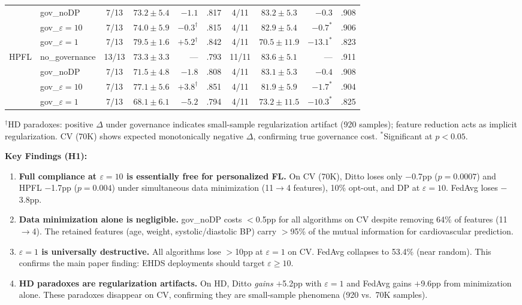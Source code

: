 \documentclass[conference]{IEEEtran}
\begin{document}
\begin{table}[htbp]
{\begin{tabular}{ll cc rr cc rr}
& gov\_noDP & 7/13 & $73.2 \pm 5.4$ & $-1.1$ & .817 & 4/11 & $83.2 \pm 5.3$ & $-0.3$ & .908 \\
& gov\_$\varepsilon{=}10$ & 7/13 & $74.0 \pm 5.9$ & $-0.3^{\dagger}$ & .815 & 4/11 & $\mathbf{82.9 \pm 5.4}$ & $\mathbf{-0.7^*}$ & .906 \\
& gov\_$\varepsilon{=}1$ & 7/13 & $79.5 \pm 1.6$ & $+5.2^{\dagger}$ & .842 & 4/11 & $70.5 \pm 11.9$ & $-13.1^*$ & .823 \\
\midrule
\multirow{4}{*}{HPFL}
& no\_governance & 13/13 & $73.3 \pm 3.3$ & --- & .793 & 11/11 & $83.6 \pm 5.1$ & --- & .911 \\
& gov\_noDP & 7/13 & $71.5 \pm 4.8$ & $-1.8$ & .808 & 4/11 & $83.1 \pm 5.3$ & $-0.4$ & .908 \\
& gov\_$\varepsilon{=}10$ & 7/13 & $77.1 \pm 5.6$ & $+3.8^{\dagger}$ & .851 & 4/11 & $81.9 \pm 5.9$ & $-1.7^*$ & .904 \\
& gov\_$\varepsilon{=}1$ & 7/13 & $68.1 \pm 6.1$ & $-5.2$ & .794 & 4/11 & $73.2 \pm 11.5$ & $-10.3^*$ & .825 \\
\bottomrule
\end{tabular}%
}
\par{\footnotesize $^{\dagger}$HD paradoxes: positive $\Delta$ under governance indicates small-sample regularization artifact (920 samples); feature reduction acts as implicit regularization. CV (70K) shows expected monotonically negative $\Delta$, confirming true governance cost. $^*$Significant at $p{<}0.05$.}
\end{table}

\noindent\textbf{Key Findings (H1):}
\begin{enumerate}
    \item \textbf{Full compliance at $\varepsilon{=}10$ is essentially free for personalized FL.} On CV (70K), Ditto loses only $-$0.7pp ($p{=}0.0007$) and HPFL $-$1.7pp ($p{=}0.004$) under simultaneous data minimization (11$\to$4 features), 10\% opt-out, and DP at $\varepsilon{=}10$. FedAvg loses $-$3.8pp.
    \item \textbf{Data minimization alone is negligible.} gov\_noDP costs $<$0.5pp for all algorithms on CV despite removing 64\% of features (11$\to$4). The retained features (age, weight, systolic/diastolic BP) carry $>$95\% of the mutual information for cardiovascular prediction.
    \item \textbf{$\varepsilon{=}1$ is universally destructive.} All algorithms lose $>$10pp at $\varepsilon{=}1$ on CV. FedAvg collapses to 53.4\% (near random). This confirms the main paper finding: EHDS deployments should target $\varepsilon \geq 10$.
    \item \textbf{HD paradoxes are regularization artifacts.} On HD, Ditto \textit{gains} $+$5.2pp with $\varepsilon{=}1$ and FedAvg gains $+$9.6pp from minimization alone. These paradoxes disappear on CV, confirming they are small-sample phenomena (920 vs.\ 70K samples).
\end{enumerate}
\end{document}

